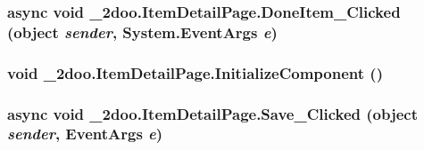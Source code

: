 \hypertarget{class__2doo_1_1_item_detail_page_22435577b872f8d70e0db423792bd600}{
\subsubsection[{DoneItem\_\-Clicked}]{\setlength{\rightskip}{0pt plus 5cm}async void \_\-2doo.ItemDetailPage.DoneItem\_\-Clicked (object {\em sender}, \/  System.EventArgs {\em e})}}
\label{class__2doo_1_1_item_detail_page_22435577b872f8d70e0db423792bd600}


\hypertarget{class__2doo_1_1_item_detail_page_4bc5039db0e4bfbf7d08f1437f9fe386}{
\subsubsection[{InitializeComponent}]{\setlength{\rightskip}{0pt plus 5cm}void \_\-2doo.ItemDetailPage.InitializeComponent ()}}
\label{class__2doo_1_1_item_detail_page_4bc5039db0e4bfbf7d08f1437f9fe386}


\hypertarget{class__2doo_1_1_item_detail_page_39431cea797e82cfbbed62fdba2178f2}{
\subsubsection[{Save\_\-Clicked}]{\setlength{\rightskip}{0pt plus 5cm}async void \_\-2doo.ItemDetailPage.Save\_\-Clicked (object {\em sender}, \/  EventArgs {\em e})}}
\label{class__2doo_1_1_item_detail_page_39431cea797e82cfbbed62fdba2178f2}




